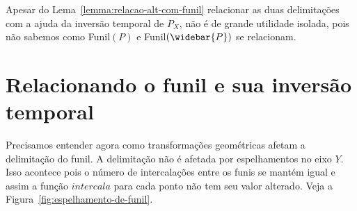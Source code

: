 Apesar do Lema~\ref{lemma:relacao-alt-com-funil} relacionar as duas delimitações com a ajuda da inversão temporal de $P_X$, não é de grande utilidade isolada, pois não sabemos como Funil$(P)$ e Funil$(\widebar{P})$ se relacionam.

\section{Relacionando o funil e sua inversão temporal}

Precisamos entender agora como transformações geométricas afetam a delimitação do funil. A delimitação não é afetada por espelhamentos no eixo $Y$. Isso acontece pois o número de intercalações entre os funis se mantém igual e assim a função $intercala$ para cada ponto não tem seu valor alterado. Veja a Figura~\ref{fig:espelhamento-de-funil}.

